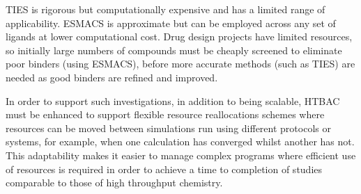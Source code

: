 
TIES is rigorous but computationally expensive and has a limited range of 
applicability.
ESMACS is approximate but can be employed across any set of ligands at lower 
computational cost.
Drug design projects have limited resources,
so initially large numbers of compounds must be cheaply screened
to eliminate poor binders (using ESMACS), 
before more accurate methods (such as
TIES) are needed as good binders are refined and improved. %

In order to support such
investigations, in addition to being scalable, HTBAC must be enhanced to
support flexible resource reallocations schemes where resources can be moved
between simulations run using different protocols or systems, for example,
when one calculation has converged whilst another has not. This adaptability
makes it easier to manage complex programs where efficient use of resources
is required in order to achieve a time to completion of studies comparable to
those of high throughput chemistry. 





